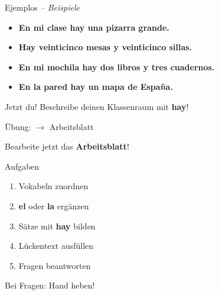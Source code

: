\documentclass[aspectratio=169, 11pt]{beamer}
\newcommand{\es}[1]{\textbf{\textcolor{spanischrot}{#1}}}
\newcommand{\de}[1]{{\small\textcolor{dunkelgrau}{\textit{#1}}}}
\begin{document}
\begin{frame}{Ejemplos \de{-- Beispiele}}

\begin{itemize}
    \item[\textcolor{spanischrot}{\textbullet}] \es{En mi clase hay una pizarra grande.}
    \item[\textcolor{spanischrot}{\textbullet}] \es{Hay veinticinco mesas y veinticinco sillas.}
    \item[\textcolor{spanischrot}{\textbullet}] \es{En mi mochila hay dos libros y tres cuadernos.}
    \item[\textcolor{spanischrot}{\textbullet}] \es{En la pared hay un mapa de España.}
\end{itemize}

\vspace{1cm}

\begin{block}{Jetzt du!}
Beschreibe deinen Klassenraum mit \es{hay}!
\end{block}

\end{frame}

\begin{frame}{Übung: $\rightarrow$ Arbeitsblatt}

\begin{center}
{\Large Bearbeite jetzt das \textbf{Arbeitsblatt}!}
\end{center}

\vspace{1cm}

\begin{block}{Aufgaben}
\begin{enumerate}
    \item Vokabeln zuordnen
    \item \es{el} oder \es{la} ergänzen
    \item Sätze mit \es{hay} bilden
    \item Lückentext ausfüllen
    \item Fragen beantworten
\end{enumerate}
\end{block}

\vspace{0.5cm}

\begin{center}
{\small\textcolor{dunkelgrau}{Bei Fragen: Hand heben!}}
\end{center}

\end{frame}
\end{document}
